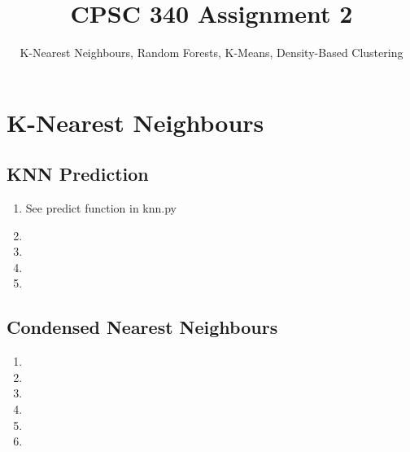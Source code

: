 \documentclass{article}
\begin{document}
\def\blu#1{{\color{blu}#1}}
\def\gre#1{{\color{gre}#1}}
\def\red#1{{\color{red}#1}}
\def\norm#1{\|#1\|}
\newcommand{\argmin}[1]{\mathop{\hbox{argmin}}_{#1}}
\newcommand{\argmax}[1]{\mathop{\hbox{argmax}}_{#1}}
\def\R{\mathbb{R}}
\newcommand{\fig}[2]{\texttt{[image: \#2]}}
\newcommand{\centerfig}[2]{\begin{center}\texttt{[image: \#2]}\end{center}}
\def\items#1{\begin{itemize}#1\end{itemize}}
\def\enum#1{\begin{enumerate}#1\end{enumerate}}
\def\answer#1{\iftoggle{answers}{\blu{Answer}:\\#1}}
\def\rubric#1{Rubric: \{#1\}}{}
\newcommand{\code}[1]{}


\title{CPSC 340 Assignment 2}
\author{K-Nearest Neighbours, Random Forests, K-Means, Density-Based Clustering}
\date{}
\maketitle

\section{K-Nearest Neighbours}
\subsection{KNN Prediction}
\begin{enumerate}
\item See predict function in knn.py
\item 
\item
\item
\item
\end{enumerate}
\subsection{Condensed Nearest Neighbours}
\begin{enumerate}
\item
\item
\item
\item
\item
\item
\end{enumerate}
\end{document}

